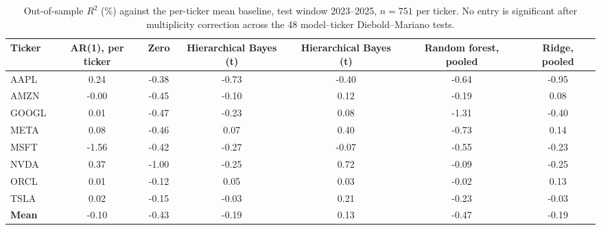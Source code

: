 \begin{table}[htbp]
\centering
\caption{Out-of-sample $R^2$ (\%) against the per-ticker mean baseline, test window 2023--2025, $n=751$ per ticker. No entry is significant after multiplicity correction across the 48 model--ticker Diebold--Mariano tests.}
\label{tab:per-ticker}
\begin{tabular}{l S[table-format=-2.2] S[table-format=-2.2] S[table-format=-2.2] S[table-format=-2.2] S[table-format=-2.2] S[table-format=-2.2]}
\toprule
Ticker & {AR(1), per ticker} & {Zero} & {Hierarchical Bayes (t)} & {Hierarchical Bayes (t)} & {Random forest, pooled} & {Ridge, pooled} \\
\midrule
AAPL & 0.24 & -0.38 & -0.73 & -0.40 & -0.64 & -0.95 \\
AMZN & -0.00 & -0.45 & -0.10 & 0.12 & -0.19 & 0.08 \\
GOOGL & 0.01 & -0.47 & -0.23 & 0.08 & -1.31 & -0.40 \\
META & 0.08 & -0.46 & 0.07 & 0.40 & -0.73 & 0.14 \\
MSFT & -1.56 & -0.42 & -0.27 & -0.07 & -0.55 & -0.23 \\
NVDA & 0.37 & -1.00 & -0.25 & 0.72 & -0.09 & -0.25 \\
ORCL & 0.01 & -0.12 & 0.05 & 0.03 & -0.02 & 0.13 \\
TSLA & 0.02 & -0.15 & -0.03 & 0.21 & -0.23 & -0.03 \\
\midrule
\textbf{Mean} & -0.10 & -0.43 & -0.19 & 0.13 & -0.47 & -0.19 \\
\bottomrule
\end{tabular}
\end{table}